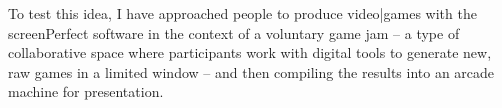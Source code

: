 To test this idea, I have approached people to produce video|games with the screenPerfect software in the context of a voluntary game jam – a type of collaborative space where participants work with digital tools to generate new, raw games in a limited window – and then compiling the results into an arcade machine for presentation. 
